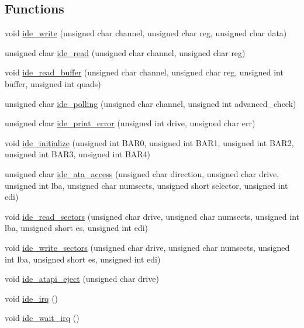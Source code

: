 \subsection*{Functions}
\begin{DoxyCompactItemize}
\item 
void \hyperlink{a00026_afdb22c37a32d86fcb64e55b3edab4790_afdb22c37a32d86fcb64e55b3edab4790}{ide\+\_\+write} (unsigned char channel, unsigned char reg, unsigned char data)
\item 
unsigned char \hyperlink{a00026_aef734da4bdc0c1d014528fd2f66e0686_aef734da4bdc0c1d014528fd2f66e0686}{ide\+\_\+read} (unsigned char channel, unsigned char reg)
\item 
void \hyperlink{a00026_ac338a611110448d6bd9b8edc491ed19b_ac338a611110448d6bd9b8edc491ed19b}{ide\+\_\+read\+\_\+buffer} (unsigned char channel, unsigned char reg, unsigned int buffer, unsigned int quads)
\item 
unsigned char \hyperlink{a00026_a03e85b94d6fbfb957e1b88c3dd064eca_a03e85b94d6fbfb957e1b88c3dd064eca}{ide\+\_\+polling} (unsigned char channel, unsigned int advanced\+\_\+check)
\item 
unsigned char \hyperlink{a00026_af7757307613c29c9bcbf0f8f5b2feee5_af7757307613c29c9bcbf0f8f5b2feee5}{ide\+\_\+print\+\_\+error} (unsigned int drive, unsigned char err)
\item 
void \hyperlink{a00026_ab5397c8432be802172da8f04c8840ca3_ab5397c8432be802172da8f04c8840ca3}{ide\+\_\+initialize} (unsigned int B\+A\+R0, unsigned int B\+A\+R1, unsigned int B\+A\+R2, unsigned int B\+A\+R3, unsigned int B\+A\+R4)
\item 
unsigned char \hyperlink{a00026_a4da0883393a98b937fdc3015a0a3f265_a4da0883393a98b937fdc3015a0a3f265}{ide\+\_\+ata\+\_\+access} (unsigned char direction, unsigned char drive, unsigned int lba, unsigned char numsects, unsigned short selector, unsigned int edi)
\item 
void \hyperlink{a00026_a9dd84843412753d236e17a15277c5b98_a9dd84843412753d236e17a15277c5b98}{ide\+\_\+read\+\_\+sectors} (unsigned char drive, unsigned char numsects, unsigned int lba, unsigned short es, unsigned int edi)
\item 
void \hyperlink{a00026_a8632fb3a8cd41b7d60ee56942afbde03_a8632fb3a8cd41b7d60ee56942afbde03}{ide\+\_\+write\+\_\+sectors} (unsigned char drive, unsigned char numsects, unsigned int lba, unsigned short es, unsigned int edi)
\item 
void \hyperlink{a00026_a92d054539c112a72e080e35a3341b0b9_a92d054539c112a72e080e35a3341b0b9}{ide\+\_\+atapi\+\_\+eject} (unsigned char drive)
\item 
void \hyperlink{a00026_ad7ea572af581cc0623a2fb74a579ca83_ad7ea572af581cc0623a2fb74a579ca83}{ide\+\_\+irq} ()
\item 
void \hyperlink{a00026_a31655fcec0cc8f9f8792b98cd4441fdf_a31655fcec0cc8f9f8792b98cd4441fdf}{ide\+\_\+wait\+\_\+irq} ()
\end{DoxyCompactItemize}
